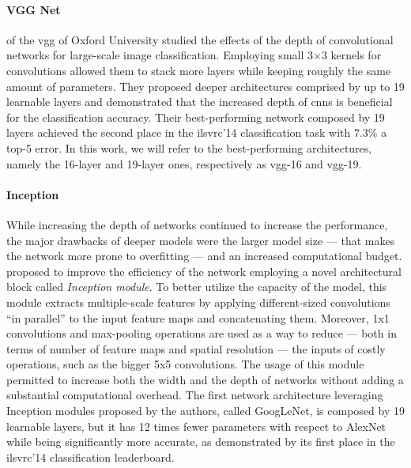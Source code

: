 \paragraph{VGG Net} %
\citet{simonyan2014very} of the \gls{vgg} of Oxford University studied the effects of the depth of convolutional networks for large-scale image classification.
Employing small 3$\times$3 kernels for convolutions allowed them to stack more layers while keeping roughly the same amount of parameters.
They proposed deeper architectures comprised by up to 19 learnable layers and demonstrated that the increased depth of \glspl{cnn} is beneficial for the classification accuracy.
Their best-performing network composed by 19 layers achieved the second place in the \gls{ilsvrc}'14 classification task with $7.3 \%$ a top-5 error.
In this work, we will refer to the best-performing architectures, namely the 16-layer and 19-layer ones, respectively as \gls{vgg}-16 and \gls{vgg}-19.

\paragraph{Inception}
While increasing the depth of networks continued to increase the performance, the major drawbacks of deeper models were the larger model size --- that makes the network more prone to overfitting --- and an increased computational budget.
\citet{szegedy2015going} proposed to improve the efficiency of the network employing a novel architectural block called \emph{Inception module}.
To better utilize the capacity of the model, this module extracts multiple-scale features by applying different-sized convolutions ``in parallel'' to the input feature maps and concatenating them.
Moreover, 1x1 convolutions and max-pooling operations are used as a way to reduce --- both in terms of number of feature maps and spatial resolution --- the inputs of costly operations, such as the bigger 5x5 convolutions.
The usage of this module permitted to increase both the width and the depth of networks without adding a substantial computational overhead.
The first network architecture leveraging Inception modules proposed by the authors, called GoogLeNet, is composed by 19 learnable layers, but it has 12 times fewer parameters with respect to AlexNet while being significantly more accurate, as demonstrated by its first place in the \gls{ilsvrc}'14 classification leaderboard.



